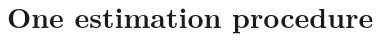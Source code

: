 

\section{One estimation procedure}
\setcounter{theorem}{0}
\setcounter{equation}{0}


\renewcommand{\theenumi}{\roman{enumi}}
\renewcommand{\labelenumi}{\textnormal{(\theenumi)}$\;\;$}


\renewcommand{\theenumi}{\arabic{enumi}}
\renewcommand{\labelenumi}{\textnormal{(\theenumi)}$\;\;$}

